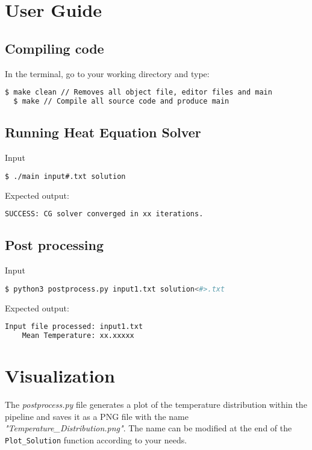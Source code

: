 \documentclass[a4paper]{article}
\begin{document}
\section{User Guide}

\subsection{Compiling code}
\noindent In the terminal, go to your working directory and type:
\begin{lstlisting}[language=bash]
  $ make clean // Removes all object file, editor files and main
  $ make // Compile all source code and produce main
\end{lstlisting}
\subsection{Running Heat Equation Solver}
Input
\begin{lstlisting}[language=bash]
  $ ./main input#.txt solution 
\end{lstlisting}
Expected output:
\begin{lstlisting}[language=bash]
  SUCCESS: CG solver converged in xx iterations.
\end{lstlisting}
\subsection{Post processing}
Input
\begin{lstlisting}[language=bash]
  $ python3 postprocess.py input1.txt solution<#>.txt
\end{lstlisting}
Expected output:
\begin{lstlisting}[language=bash]
    Input file processed: input1.txt
    Mean Temperature: xx.xxxxx
\end{lstlisting}

\section{Visualization}
The \textit{postprocess.py} file generates a plot of the temperature distribution within the pipeline and saves it as a PNG file with the name \textit{"Temperature\_Distribution.png"}. The name can be modified at the end of the \texttt{Plot\_Solution} function according to your needs. 
\end{document}
